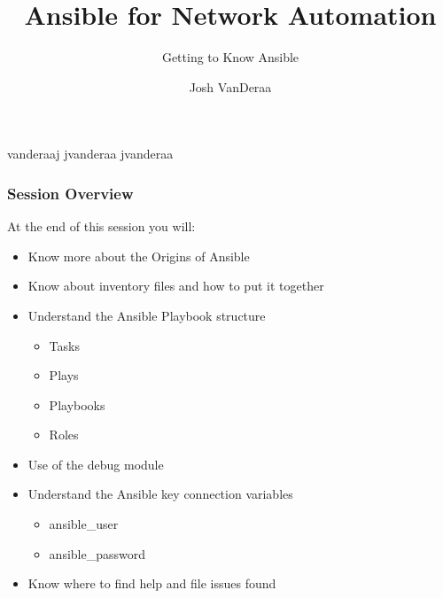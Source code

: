 \documentclass{beamer}
\title{Ansible for Network Automation}
\subtitle{Getting to Know Ansible}
\date{}
\author{Josh VanDeraa}
\begin{document}
\begin{frame}
  \maketitle
  \footnotesize
  \faTwitter vanderaaj \hfill \faGithub jvanderaa \hfill \faSlack jvanderaa
\end{frame}

\begin{frame}
  \frametitle{Session Overview}
  At the end of this session you will:
  \begin{itemize}
    \item <2-> Know more about the Origins of Ansible
    \item <3-> Know about inventory files and how to put it together
    \item <4-> Understand the Ansible Playbook structure
    \begin{itemize}
      \item <4-> Tasks
      \item <5-> Plays
      \item <6-> Playbooks
      \item <7-> Roles
    \end{itemize}
    \item <8-> Use of the debug module
    \item <9-> Understand the Ansible key connection variables
    \begin{itemize}
      \item <9-> ansible\_user
      \item <10-> ansible\_password
    \end{itemize}
    \item <11-> Know where to find help and file issues found
  \end{itemize}
\end{frame}
\end{document}
